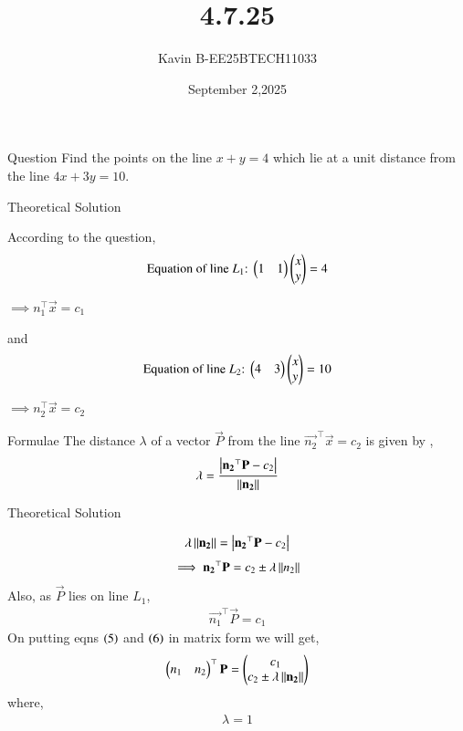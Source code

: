 \documentclass{beamer}
\begin{document}
\title 
{4.7.25}
\date{September 2,2025}


\author 
{Kavin B-EE25BTECH11033}






\frame{\titlepage}
\begin{frame}{Question}
Find the points on the line $x+y=4$ which lie at a unit distance from the line $4x+3y=10$.\\
\end{frame}



\begin{frame}{Theoretical Solution}

According to the question,\\
\begin{align}
    \text{Equation of line $L_1$:}\ \begin{pmatrix}1&1\end{pmatrix}\begin{pmatrix}x\\y\end{pmatrix}=4
\end{align}
\begin{center}
    $\implies n_1^{\top} \vec{x} = c_1$
\end{center}
and
\begin{align}
    \text{Equation of line $L_2$:}\ \begin{pmatrix}4&3\end{pmatrix}\begin{pmatrix}x\\y\end{pmatrix}=10
\end{align}
\begin{center}
    $\implies n_2^{\top} \vec{x} = c_2$
\end{center}
\end{frame}

\begin{frame}{Formulae}
The distance $\lambda$ of a vector $\vec{P}$ from the line $\vec{n_2}^{\top}\vec{x}=c_2$ is given by ,
\begin{align}
    \lambda = \frac{\left\vert\mathbf{n_2}^{\top}\mathbf{P} - c_2\right\vert}{\left\lVert\mathbf{n_2}\right\rVert}  
\end{align}
\end{frame}

\begin{frame}{Theoretical Solution}

\begin{align}
    \lambda\left\lVert\mathbf{n_2}\right\rVert = \left\vert\mathbf{n_2}^{\top}\mathbf{P} - c_2\right\vert 
\end{align}
\begin{align}
    \implies\mathbf{n_2}^{\top}\mathbf{P} = c_2 \pm \lambda\left\lVert n_2\right\rVert
\end{align}
Also, as $\vec{P}$ lies on line $L_1$,
\begin{align}
    \vec{n_1}^{\top}\vec{P} = c_1
\end{align}
On putting eqns $\left(5\right)$ and $\left(6\right)$ in matrix form we will get,
\begin{align}
    \begin{pmatrix}n_1 & n_2\end{pmatrix}^\top\mathbf{P}=\begin{pmatrix}c_1\\c_2\pm\lambda\left\lVert\mathbf{n_2}\right\rVert\end{pmatrix}
\end{align}
where,
\begin{align*}
    \lambda = 1
\end{align*}

\end{frame}
\end{document}
